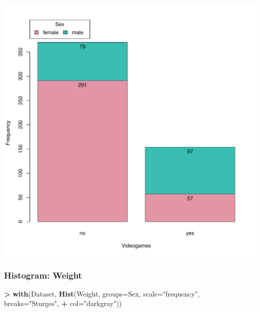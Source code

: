 \documentclass[
]{article}
\newenvironment{Shaded}{\begin{snugshade}}{\end{snugshade}}
\newcommand{\AttributeTok}[1]{\textcolor[rgb]{0.13,0.29,0.53}{#1}}
\newcommand{\FunctionTok}[1]{\textcolor[rgb]{0.13,0.29,0.53}{\textbf{#1}}}
\newcommand{\NormalTok}[1]{#1}
\newcommand{\SpecialCharTok}[1]{\textcolor[rgb]{0.81,0.36,0.00}{\textbf{#1}}}
\newcommand{\StringTok}[1]{\textcolor[rgb]{0.31,0.60,0.02}{#1}}
\begin{document}
\includegraphics[width=750px]{RcmdrMarkdown_files/figure-latex/unnamed-chunk-14-1}

\subsubsection{Histogram: Weight}\label{histogram-weight-1}

\begin{Shaded}
\begin{Highlighting}[]
\SpecialCharTok{\textgreater{}} \FunctionTok{with}\NormalTok{(Dataset, }\FunctionTok{Hist}\NormalTok{(Weight, }\AttributeTok{groups=}\NormalTok{Sex, }\AttributeTok{scale=}\StringTok{"frequency"}\NormalTok{, }\AttributeTok{breaks=}\StringTok{"Sturges"}\NormalTok{, }
\SpecialCharTok{+}   \AttributeTok{col=}\StringTok{"darkgray"}\NormalTok{))}
\end{Highlighting}
\end{Shaded}
\end{document}
